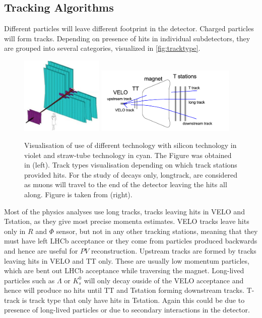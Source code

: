 \subsection{Tracking Algorithms}
Different particles will leave different footprint in the detector. Charged particles will form tracks. Depending on presence of hits in individual subdetectors, they are grouped into several categories, visualized in \autoref{fig:tracktype}.

\begin{figure}[!h]
	\centering
	\includegraphics[width = 0.35\textwidth]{figs/detector/trackingsystem.jpg}%
	\includegraphics[width = 0.6\textwidth]{figs/detector/tracktype.png}
	\caption{ Visualisation of use of different technology with silicon technology in violet and straw-tube technology in cyan. The Figure was obtained in \cite{OT}(left). Track types visualisation depending on which track stations provided hits. For the study of \Bmumumu decays only, \Gls{longtrack}, are considered as muons will travel to the end of the detector leaving the hits all along. Figure is taken from \cite{LHCb-DP-2013-002} (right).}
	\label{fig:tracktype}
\end{figure}


Most of the physics analyses use long tracks, tracks leaving hits in \Gls{VELO} and \Gls{Tstation}, as they give most precise momenta estimates.
VELO tracks leave hits only in $R$ and $\Phi$ sensor, but not in any other tracking stations, meaning that they must have left \Gls{LHCb} acceptance or they come from particles produced backwards and hence are useful for $PV$ reconstruction. Upstream tracks are formed by tracks leaving hits in \Gls{VELO} and TT only. These are usually low momentum particles, which are bent out \Gls{LHCb} acceptance while traversing the magnet. Long-lived particles such as $\Lambda$ or $K^{0}_{s}$ will only decay ouside of the \Gls{VELO} acceptance and hence will produce no hits until \Gls{TT} and \Gls{Tstation} forming downstream tracks. T-track is track type that only have hits in \Gls{Tstation}. Again this could be due to presence of long-lived particles or due to secondary interactions in the detector.   

